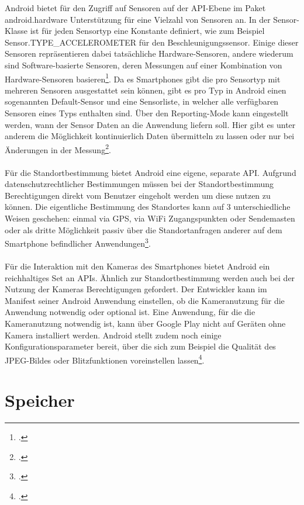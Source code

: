 Android bietet für den Zugriff auf Sensoren auf der API-Ebene im Paket android.hardware Unterstützung für eine Vielzahl von Sensoren an. In der Sensor-Klasse ist für jeden Sensortyp eine Konstante definiert, wie zum Beispiel \\ Sensor.TYPE\_ACCELEROMETER für den Beschleunigungssensor. Einige dieser Sensoren repräsentieren dabei tatsächliche Hardware-Sensoren, andere wiederum sind Software-basierte Sensoren, deren Messungen auf einer Kombination von Hardware-Sensoren basieren\footcite{Android5}. Da es Smartphones gibt die pro Sensortyp mit mehreren Sensoren ausgestattet sein können, gibt es pro Typ in Android einen sogenannten Default-Sensor und eine Sensorliste, in welcher alle verfügbaren Sensoren eines Typs enthalten sind. Über den Reporting-Mode kann eingestellt werden, wann der Sensor Daten an die Anwendung liefern soll. Hier gibt es unter anderem die Möglichkeit kontinuierlich Daten übermitteln zu lassen oder nur bei Änderungen in der Messung\footcite{AndroidQuickAPI}. 
\\
\\
Für die Standortbestimmung bietet Android eine eigene, separate API. Aufgrund datenschutzrechtlicher Bestimmungen müssen bei der Standortbestimmung Berechtigungen direkt vom Benutzer eingeholt werden um diese nutzen zu können. Die eigentliche Bestimmung des Standortes kann auf 3 unterschiedliche Weisen geschehen: einmal via GPS, via WiFi Zugangspunkten oder Sendemasten oder als dritte Möglichkeit passiv über die Standortanfragen anderer auf dem Smartphone befindlicher Anwendungen\footcite{AndroidQuickAPI}. 
\\
\\
Für die Interaktion mit den Kameras des Smartphones bietet Android ein reichhaltiges Set an APIs. Ähnlich zur Standortbestimmung werden auch bei der Nutzung der Kameras Berechtigungen gefordert. Der Entwickler kann im Manifest seiner Android Anwendung einstellen, ob die Kameranutzung für die Anwendung notwendig oder optional ist. Eine Anwendung, für die die Kameranutzung notwendig ist, kann über Google Play nicht auf Geräten ohne Kamera installiert werden. Android stellt zudem noch einige Konfigurationsparameter bereit, über die sich zum Beispiel die Qualität des JPEG-Bildes oder Blitzfunktionen voreinstellen lassen\footcite{AndroidQuickAPI}. 

\section{Speicher} \label{PlanungAnwSpeicher}

